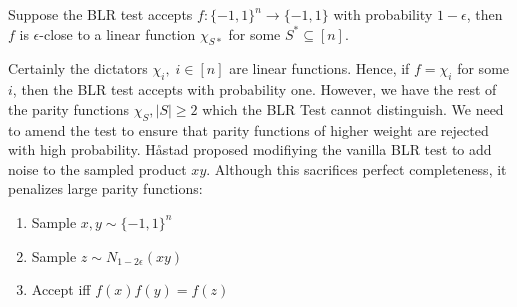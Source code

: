 \begin{theorem}
  Suppose the BLR test accepts $f:\{-1,1\}^n \rightarrow \{-1,1\}$ with probability $1 - \epsilon$, then $f$ is $\epsilon$-close to a linear function $\chi_{S*}$ for some $S^* \subseteq [n]$.
\end{theorem}
%
Certainly the dictators $\chi_i, \; i \in [n]$ are linear functions. Hence, if $f = \chi_i$ for some $i$, then the BLR test accepts with probability one. However, we have the rest of the parity functions $\chi_{S}, |S| \geq 2$ which the BLR Test cannot distinguish. We need to amend the test to ensure that parity functions of higher weight are rejected with high probability. H\aa stad proposed modifiying the vanilla BLR test to add noise to the sampled product $xy$. Although this sacrifices perfect completeness, it penalizes large parity functions: \newline
%
\begin{enumerate}
  \item Sample $x,y \sim \{-1,1\}^n$
  \item Sample $z \sim N_{1-2\epsilon}(xy)$
  \item Accept iff $f(x)f(y)=f(z)$
\end{enumerate}
%

